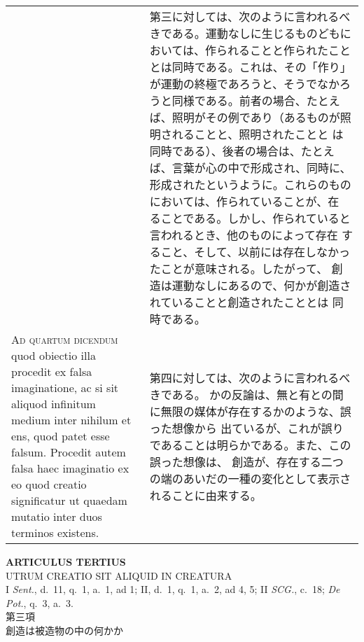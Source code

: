 \documentclass[10pt]{jsarticle} %
\begin{document}
\begin{longtable}{p{21em}p{21em}}
&

第三に対しては、次のように言われるべきである。運動なしに生じるものどもに
 おいては、作られることと作られたこととは同時である。これは、その「作り」
 が運動の終極であろうと、そうでなかろうと同様である。前者の場合、たとえ
 ば、照明がその例であり（あるものが照明されることと、照明されたことと
 は同時である）、後者の場合は、たとえば、言葉が心の中で形成され、同時に、
 形成されたというように。これらのものにおいては、作られていることが、在
 ることである。しかし、作られていると言われるとき、他のものによって存在
 すること、そして、以前には存在しなかったことが意味される。したがって、
 創造は運動なしにあるので、何かが創造されていることと創造されたこととは
 同時である。

\\

{\scshape Ad quartum dicendum} quod obiectio illa procedit ex falsa imaginatione,
 ac si sit aliquod infinitum medium inter nihilum et ens, quod patet
 esse falsum. Procedit autem falsa haec imaginatio ex eo quod creatio
 significatur ut quaedam mutatio inter duos terminos existens.

&

第四に対しては、次のように言われるべきである。
かの反論は、無と有との間に無限の媒体が存在するかのような、誤った想像から
 出ているが、これが誤りであることは明らかである。また、この誤った想像は、
 創造が、存在する二つの端のあいだの一種の変化として表示されることに由来する。


\end{longtable}

\newpage
{}

\begin{center}
 {\Large {\bf ARTICULUS TERTIUS}}\\
 {\large UTRUM CREATIO SIT ALIQUID IN CREATURA}\\
 {\footnotesize I {\itshape Sent.}, d.~11, q.~1, a.~1, ad 1; II, d.~1,
 q.~1, a.~2, ad 4, 5; II {\itshape SCG.}, c.~18; {\itshape De Pot.},
 q.~3, a.~3.}\\
 {\Large 第三項\\創造は被造物の中の何かか}
\end{center}
\end{document}
